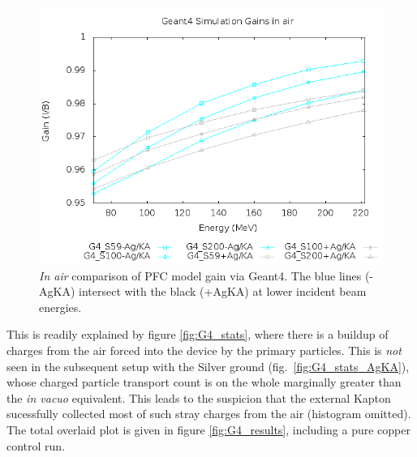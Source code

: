 \documentclass{article}
\begin{document}
\begin{figure}[H]
  \centering
  \includegraphics[width=5in]{figures/fig_G4_results_air.png}
  \caption{\emph{In air} comparison of PFC model gain via Geant4.  The blue lines (-AgKA) intersect with the black (+AgKA) at lower incident beam energies.} 
  \label{fig:G4_results_air}
\end{figure}

This is readily explained by figure \ref{fig:G4_stats}, where there is a buildup of charges from the air forced into the device by the primary particles.  This is \emph{not} seen in the subsequent setup with the Silver ground (fig.~\ref{fig:G4_stats_AgKA}), whose charged particle transport count is on the whole marginally greater than the \emph{in vacuo} equivalent.  This leads to the suspicion that the external Kapton sucessfully collected most of such stray charges from the air (histogram omitted). \\

The total overlaid plot is given in figure \ref{fig:G4_results}, including a pure copper control run.
\end{document}
